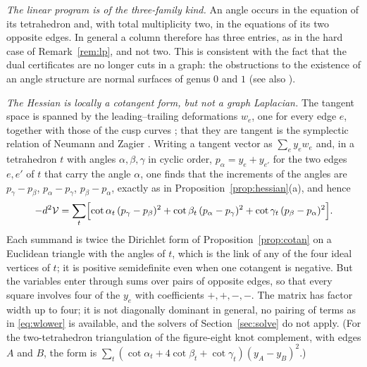 \documentclass[11pt]{amsart}
\theoremstyle{definition}
\theoremstyle{remark}
\begin{document}
\emph{The linear program is of the three-family kind.} An angle occurs in the equation of its tetrahedron and, with total multiplicity two, in the equations of its two opposite edges. In general a column therefore has three entries, as in the hard case of Remark~\ref{rem:lp}, and not two. This is consistent with the fact that the dual certificates are no longer cuts in a graph:
the obstructions to the existence of an angle structure are normal surfaces of genus $0$ and $1$ \cite{Riv03} (see also \cite{LT08}).

\emph{The Hessian is locally a cotangent form, but not a graph Laplacian.} The tangent space is spanned by the leading--trailing deformations $w_e$, one for every edge $e$, together with those of the cusp curves \cite{FG11}; that they are tangent is the symplectic relation of Neumann and Zagier \cite{NZ85}. Writing a tangent vector as $\sum_ey_ew_e$ and, in a tetrahedron $t$ with angles $\alpha,\beta,\gamma$ in cyclic order,
$p_\alpha=y_{e}+y_{e'}$ for the two edges $e,e'$ of $t$ that carry the angle $\alpha$, one finds that the increments of the angles are $p_\gamma-p_\beta$, $p_\alpha-p_\gamma$, $p_\beta-p_\alpha$, exactly as in Proposition~\ref{prop:hessian}(a), and hence
\[
-d^2\mathcal V=\sum_t\Bigl[\cot\alpha_t\,(p_\gamma-p_\beta)^2+\cot\beta_t\,(p_\alpha-p_\gamma)^2+\cot\gamma_t\,(p_\beta-p_\alpha)^2\Bigr].
\]
Each summand is twice the Dirichlet form of Proposition~\ref{prop:cotan} on a Euclidean triangle with the angles of $t$, which is the link of any of the four ideal vertices of $t$; it is positive semidefinite even when one cotangent is negative. But the variables enter through sums over pairs of opposite edges, so that every square involves four of the $y_e$ with
coefficients $+,+,-,-$. The matrix has factor width up to four; it is not diagonally dominant in general, no pairing of terms as in \eqref{eq:wlower} is available, and the solvers of Section~\ref{sec:solve} do not apply. (For the two-tetrahedron triangulation of the figure-eight knot complement, with edges $A$ and $B$, the form is $\sum_t(\cot\alpha_t+4\cot\beta_t+\cot\gamma_t)(y_A-y_B)^2$.)
\end{document}
